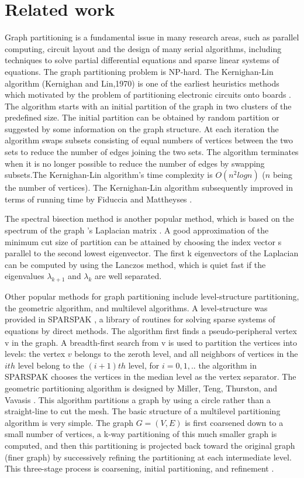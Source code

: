 \documentclass{acm_proc_article-sp}
\begin{document}
\section{Related work}
Graph partitioning is a fundamental issue in many research areas, such as parallel computing, circuit layout and the design of many serial algorithms, including techniques to solve partial differential equations and sparse linear systems of equations. The graph partitioning problem is NP-hard. The Kernighan-Lin algorithm (Kernighan and Lin,1970) is one of the earliest heuristics methods which motivated by the problem of partitioning electronic circuits onto boards \cite{kl:partition}. The algorithm starts with an initial partition of the graph in two clusters of the predefined size. The initial partition can be obtained by random partition or suggested by some information on the graph structure. At each iteration the algorithm swaps subsets consisting of equal numbers of vertices between the two sets to reduce the number of edges joining the two sets. The algorithm terminates when it is no longer possible to reduce the number of edges by swapping subsets.The Kernighan-Lin algorithm's time complexity is $O(n^{2}log n)$ ($n$ being the number of vertices). The Kernighan-Lin algorithm subsequently improved in terms of running time by Fiduccia and Mattheyses \cite{1585498}.
\par
The spectral bisection method is another popular method, which is based on the spectrum of the graph 's Laplacian matrix \cite{barnard:mrsb}. A good approximation of the minimum cut size of partition can be attained by choosing the index vector s parallel to the second lowest eigenvector. The first k eigenvectors of the Laplacian can be computed by using the Lanczos method, which is quiet fast if the eigenvalues $\lambda_{k+1}$ and $\lambda_{k}$ are well separated.
\par
Other popular methods for graph partitioning include level-structure partitioning, the geometric algorithm, and multilevel algorithms. A level-structure was provided in SPARSPAK \cite{tech:sparspak}, a library of routines for solving sparse systems of equations by direct methods. The algorithm first finds a pseudo-peripheral vertex v in the graph. A breadth-first search from v is used to partition the vertices into levels: the vertex $v$ belongs to the zeroth level, and all neighbors of vertices in the $ith$ level belong to the $(i + 1)th$ level, for $i = 0, 1,..$ the algorithm in SPARSPAK chooses the vertices in the median level as the vertex separator. The geometric partitioning algorithm is designed by Miller, Teng, Thurston, and Vavasis \cite{Gary:amp}. This algorithm partitions a graph by using a circle rather than a straight-line to cut the mesh. The basic structure of a multilevel partitioning algorithm is very simple. The graph $G =(V, E)$ is first coarsened down to a small number of vertices, a k-way partitioning of this much smaller graph is computed, and then this partitioning is projected back toward the original graph (finer graph) by successively refining the partitioning at each intermediate level. This three-stage process is coarsening, initial partitioning, and refinement \cite{karypis:multi1}.
\end{document}

